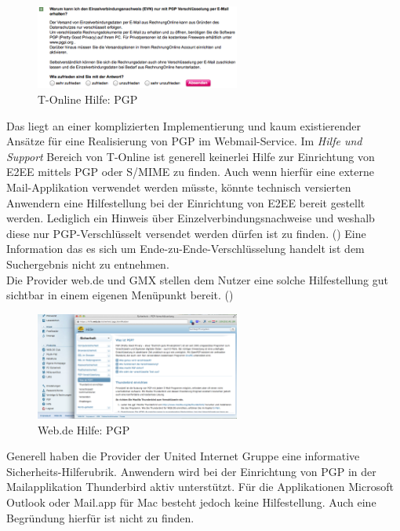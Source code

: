 \documentclass  [paper=a4,
				fontsize=12pt,
				listof=totoc,
				bibliography=totoc
				]{scrreprt}
\begin{document}
			\begin{figure} %
				\vspace{-12pt}
				\centering
				\includegraphics[width=0.6\textwidth]{images/T-Online_Hilfe_PGP}
				\caption[T-Online PGP]{T-Online Hilfe: PGP} 
				\label{fig:T-Online_Hilfe_PGP} %
				\vspace{-12pt}
			\end{figure}
			Das liegt an einer komplizierten Implementierung und kaum existierender Ansätze für eine Realisierung von PGP im Webmail-Service.
			Im \textit{Hilfe und Support} Bereich von T-Online ist generell keinerlei Hilfe zur Einrichtung von E2EE mittels PGP oder S/MIME zu finden.
			Auch wenn hierfür eine externe Mail-Applikation verwendet werden müsste, könnte technisch versierten Anwendern eine Hilfestellung bei der Einrichtung von E2EE bereit gestellt werden.
			Lediglich ein Hinweis über Einzelverbindungsnachweise und weshalb diese nur PGP-Verschlüsselt versendet werden dürfen ist zu finden. ()
			Eine Information das es sich um Ende-zu-Ende-Verschlüsselung handelt ist dem Suchergebnis nicht zu entnehmen.\\
			Die Provider web.de und GMX stellen dem Nutzer eine solche Hilfestellung gut sichtbar in einem eigenen Menüpunkt bereit. ()
			
			\begin{figure} %
				\vspace{-12pt}
				\centering
				\includegraphics[width=0.6\textwidth]{images/Web-de_Hilfe_PGP}
				\caption[Web.de PGP]{Web.de Hilfe: PGP} 
				\label{fig:Web-de_Hilfe_PGP} %
				\vspace{-24pt}
			\end{figure}
			Generell haben die Provider der United Internet Gruppe eine informative Sicherheits-Hilferubrik.
			Anwendern wird bei der Einrichtung von PGP in der Mailapplikation Thunderbird aktiv unterstützt.
			Für die Applikationen Microsoft Outlook oder Mail.app für Mac besteht jedoch keine Hilfestellung.
			Auch eine Begründung hierfür ist nicht zu finden.
\end{document}
